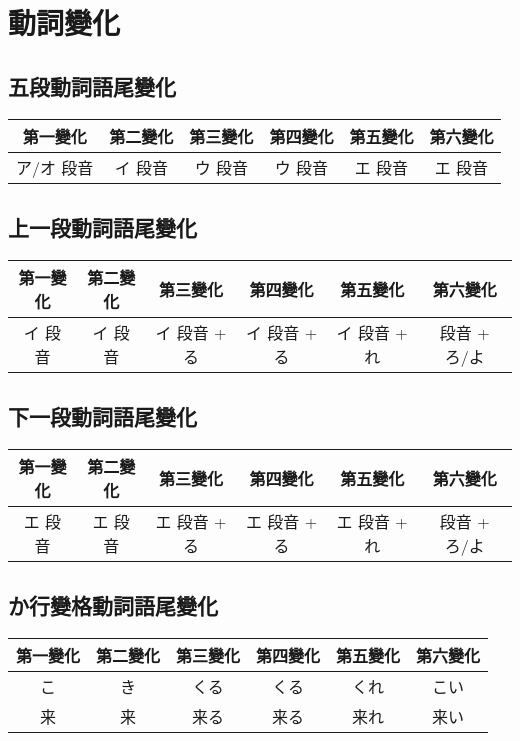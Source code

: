 \documentclass[12pt]{article}
\begin{document}
\begin{CJK}{UTF8}{cybercjk}
\begin{table}[htdp]
\begin{tabular}{cccccccccc}
\hline
\end{tabular}
\end{table}

\section{動詞變化}

\subsection{五段動詞語尾變化}
\begin{table}[htdp]
\begin{tabular}{cccccc}
第一變化 & 第二變化 & 第三變化 & 第四變化 & 第五變化 & 第六變化 \\
\hline
ア/オ 段音 & イ 段音 & ウ 段音 & ウ 段音  & エ 段音 & エ 段音  \\
\end{tabular}
\end{table}

\subsection{上一段動詞語尾變化}
\begin{table}[htdp]
\begin{tabular}{cccccc}
第一變化 & 第二變化 & 第三變化 & 第四變化 & 第五變化 & 第六變化 \\
\hline
イ 段音 & イ 段音 & イ 段音 + る &  イ 段音 + る &  イ 段音 + れ &  段音 + ろ/よ \\
\end{tabular}
\end{table}

\subsection{下一段動詞語尾變化}
\begin{table}[htdp]
\begin{tabular}{cccccc}
第一變化 & 第二變化 & 第三變化 & 第四變化 & 第五變化 & 第六變化 \\
\hline
エ 段音 & エ 段音 & エ 段音 + る &  エ 段音 + る &  エ 段音 + れ &  段音 + ろ/よ \\
\end{tabular}
\end{table}

\subsection{か行變格動詞語尾變化}
\begin{table}[htdp]
\begin{tabular}{cccccc}
第一變化 & 第二變化 & 第三變化 & 第四變化 & 第五變化 & 第六變化 \\
\hline
こ & き & くる & くる & くれ& こい \\
来 & 来 & 来る & 来る & 来れ& 来い \\
\end{tabular}
\end{table}


\end{CJK}
\end{document}
